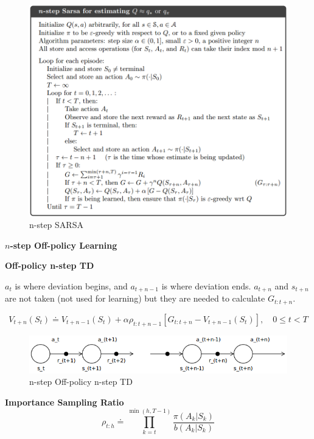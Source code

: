 \documentclass{article}
\begin{document}
\begin{figure}[h]
\includegraphics[scale=0.4]{nstep_sarsa}
\centering
\caption{n-step SARSA}
\end{figure}
    
\newpage
\noindent
\textbf{$n$-step Off-policy Learning}

\noindent
\textbf{Off-policy n-step TD}

\noindent
$a_{t}$ is where deviation begins, and $a_{t+n-1}$ is where deviation ends.
$a_{t+n}$ and $s_{t+n}$ are not taken (not used for learning) but they are
needed to calculate $G_{t:t+n}$.

\begin{equation}
V_{t+n}\left(S_{t}\right) \doteq V_{t+n-1}\left(S_{t}\right)+\alpha \rho_{t: t+n-1}\left[G_{t: t+n}-V_{t+n-1}\left(S_{t}\right)\right], \quad 0 \leq t<T
\end{equation}
\begin{figure}[h]
\includegraphics[scale=0.4]{offpolicy_nstep_td_diagram}
\centering
\caption{n-step Off-policy n-step TD}
\end{figure}

\noindent
\textbf{Importance Sampling Ratio}
\begin{equation}
\rho_{t: h} \doteq \prod_{k=t}^{\min (h, T-1)} \frac{\pi\left(A_{k} | S_{k}\right)}{b\left(A_{k} | S_{k}\right)}
\end{equation}
\end{document}
